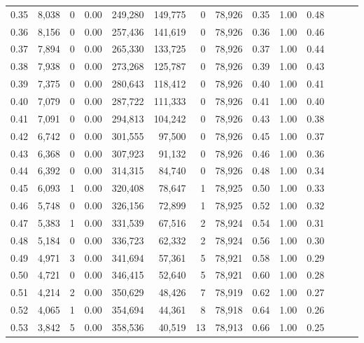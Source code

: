\begin{tabular}{rrrrrrrrrrrrrr}
0.35 &  8,038 &      0 &  0.00 &  249,280 &  149,775 &       0 &  78,926 &  0.35 &  1.00 &      0.48 \\
0.36 &  8,156 &      0 &  0.00 &  257,436 &  141,619 &       0 &  78,926 &  0.36 &  1.00 &      0.46 \\
0.37 &  7,894 &      0 &  0.00 &  265,330 &  133,725 &       0 &  78,926 &  0.37 &  1.00 &      0.44 \\
0.38 &  7,938 &      0 &  0.00 &  273,268 &  125,787 &       0 &  78,926 &  0.39 &  1.00 &      0.43 \\
0.39 &  7,375 &      0 &  0.00 &  280,643 &  118,412 &       0 &  78,926 &  0.40 &  1.00 &      0.41 \\
0.40 &  7,079 &      0 &  0.00 &  287,722 &  111,333 &       0 &  78,926 &  0.41 &  1.00 &      0.40 \\
0.41 &  7,091 &      0 &  0.00 &  294,813 &  104,242 &       0 &  78,926 &  0.43 &  1.00 &      0.38 \\
0.42 &  6,742 &      0 &  0.00 &  301,555 &   97,500 &       0 &  78,926 &  0.45 &  1.00 &      0.37 \\
0.43 &  6,368 &      0 &  0.00 &  307,923 &   91,132 &       0 &  78,926 &  0.46 &  1.00 &      0.36 \\
0.44 &  6,392 &      0 &  0.00 &  314,315 &   84,740 &       0 &  78,926 &  0.48 &  1.00 &      0.34 \\
0.45 &  6,093 &      1 &  0.00 &  320,408 &   78,647 &       1 &  78,925 &  0.50 &  1.00 &      0.33 \\
0.46 &  5,748 &      0 &  0.00 &  326,156 &   72,899 &       1 &  78,925 &  0.52 &  1.00 &      0.32 \\
0.47 &  5,383 &      1 &  0.00 &  331,539 &   67,516 &       2 &  78,924 &  0.54 &  1.00 &      0.31 \\
0.48 &  5,184 &      0 &  0.00 &  336,723 &   62,332 &       2 &  78,924 &  0.56 &  1.00 &      0.30 \\
0.49 &  4,971 &      3 &  0.00 &  341,694 &   57,361 &       5 &  78,921 &  0.58 &  1.00 &      0.29 \\
0.50 &  4,721 &      0 &  0.00 &  346,415 &   52,640 &       5 &  78,921 &  0.60 &  1.00 &      0.28 \\
0.51 &  4,214 &      2 &  0.00 &  350,629 &   48,426 &       7 &  78,919 &  0.62 &  1.00 &      0.27 \\
0.52 &  4,065 &      1 &  0.00 &  354,694 &   44,361 &       8 &  78,918 &  0.64 &  1.00 &      0.26 \\
0.53 &  3,842 &      5 &  0.00 &  358,536 &   40,519 &      13 &  78,913 &  0.66 &  1.00 &      0.25 \\

\end{tabular}
